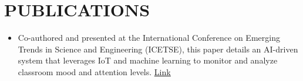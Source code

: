 \documentclass[letterpaper,11pt]{article}
\newcommand{\resumeItem}[1]{
  \item\small{
    {#1 \vspace{-1pt}}
  }
}
\newcommand{\resumeItemListStart}{\begin{itemize}[leftmargin=0.1in]}
\newcommand{\resumeItemListEnd}{\end{itemize}\vspace{-5pt}}
\begin{document}
\section{\color{airforceblue}PUBLICATIONS}
    
  \resumeItemListStart
    \resumeItem{\normalsize{Co-authored and presented at the International Conference on Emerging Trends in Science and Engineering (ICETSE), this paper details an AI-driven system that leverages IoT and machine learning to monitor and analyze classroom mood and attention levels.
}}\href{https://ibharatbhushan.netlify.app/assets/pdfs/classroom%20mood%20and%20attention%20monitoring%20system.pdf}{\color{blue}\underline{Link}}
    \vspace{-5pt}
    

    
  \resumeItemListEnd 
      
\vspace{1pt}















\end{document}
